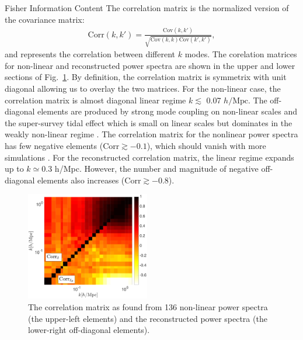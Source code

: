 \begin{section}{Fisher Information Content}
  The correlation matrix is the normalized version of the covariance
  matrix:
  \begin{align}
    \mathrm{Corr}\left(k,k'\right)=\frac{\mathrm{Cov}\left(k,k'\right)}
    {\sqrt{\mathrm{Cov}\left(k,k\right)\mathrm{Cov}\left(k',k'\right)}},
  \end{align}
  and represents the correlation between different $k$ modes.  The
  corelation matrices for non-linear and reconstructed power spectra
  are shown in the upper and lower sections of Fig.~\ref{fig:corrall}.
  By definition, the correlation matrix is symmetrix with unit
  diagonal allowing us to overlay the two matrices.  For the
  non-linear case, the correlation matrix is almost diagonal linear
  regime $k \lesssim$ 0.07 $h/\mathrm{Mpc}$.  The off-diagonal
  elements are produced by strong mode coupling on non-linear scales
  and the super-survey tidal effect which is small on linear scales
  but dominates in the weakly non-linear regime
  \cite{bib:Kazuyuki2016}.  The correlation matrix for the nonlinear
  power spectra has few negative elements
  ($\mathrm{Corr} \gtrsim -0.1$), which should vanish with more
  simulations \cite{bib:Takahashi2009}.  For the reconstructed
  correlation matrix, the linear regime expands up to $k \simeq 0.3$
  h/Mpc.  However, the number and magnitude of negative off-diagonal
  elements also increases ($\mathrm{Corr} \gtrsim -0.8$).

  \begin{figure}
    \centering
    \includegraphics[width=0.48\textwidth]{fig3.pdf}
    \caption{The correlation matrix as found from 136 non-linear power
      spectra (the upper-left elements) and the reconstructed power
      spectra (the lower-right off-diagonal elements).}
    \label{fig:corrall}
  \end{figure}


\end{section}
